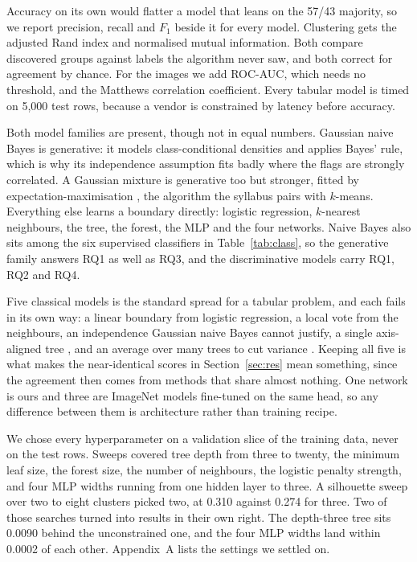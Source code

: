 \documentclass[11pt,journal,a4paper]{IEEEtran}
\begin{document}
Accuracy on its own would flatter a model that leans on the 57/43 majority, so we report precision, recall and
$F_1$ beside it for every model. Clustering gets the adjusted Rand index and normalised mutual information. Both
compare discovered groups against labels the algorithm never saw, and both correct for agreement by chance. For
the images we add ROC-AUC, which needs no threshold, and the Matthews correlation coefficient. Every tabular model
is timed on 5{,}000 test rows, because a vendor is constrained by latency before accuracy.

Both model families are present, though not in equal numbers. Gaussian naive Bayes is generative: it models
class-conditional densities and applies Bayes' rule, which is why its independence assumption fits badly where the
flags are strongly correlated. A Gaussian mixture is generative too but stronger, fitted by expectation-maximisation
\cite{dempster1977maximum}, the algorithm the syllabus pairs with $k$-means. Everything else learns a boundary
directly: logistic regression, $k$-nearest neighbours, the tree, the forest, the MLP and the four networks. Naive
Bayes also sits among the six supervised classifiers in Table~\ref{tab:class}, so the generative family answers
RQ1 as well as RQ3, and the discriminative models carry RQ1, RQ2 and RQ4.

Five classical models is the standard spread for a tabular problem, and each fails in its own way: a linear
boundary from logistic regression, a local vote from the neighbours, an independence Gaussian naive Bayes cannot
justify, a single axis-aligned tree \cite{quinlan1986induction}, and an average over many trees to cut variance
\cite{breiman2001random}. Keeping all five is what makes the near-identical scores in Section~\ref{sec:res} mean
something, since the agreement then comes from methods that share almost nothing. One network is ours and three
are ImageNet models \cite{he2016deep,tan2019efficientnet,howard2019searching} fine-tuned on the same head, so any
difference between them is architecture rather than training recipe.

We chose every hyperparameter on a validation slice of the training data, never on the test rows. Sweeps covered tree depth from three to twenty, the minimum leaf size, the forest size, the number of neighbours, the
logistic penalty strength, and four MLP widths running from one hidden layer to three. A silhouette sweep over two
to eight clusters picked two, at 0.310 against 0.274 for three. Two of those searches turned into results in their
own right. The depth-three tree sits 0.0090 behind the unconstrained one, and the four MLP widths land within
0.0002 of each other. Appendix~A lists the settings we settled on.
\end{document}
